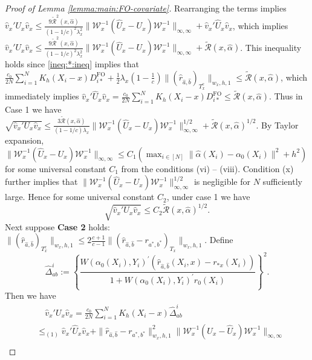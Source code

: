 \documentclass[11pt]{article}
\begin{document}
\begin{proof}[Proof of Lemma \ref{lemma:main:FO-covariate}]
Rearranging the terms implies $\hat v_x' U_x \hat v_x \leq  \frac{9\widetilde{\mathcal{R}}^2(x,\hat\alpha)}{(1-1/c)^2\lambda_x^2} \|\mathcal{W}_x^{-1}(\hat U_x - U_x)\mathcal{W}_x^{-1} \|_{\infty,\infty} + \hat v_x'\hat U_x \hat v_x$, which implies $\hat v_x' U_x \hat v_x\leq\frac{9\widetilde{\mathcal{R}}^2(x,\hat\alpha)}{(1-1/c)^2\lambda_x^2} \|\mathcal{W}_x^{-1}(\hat U_x - U_x)\mathcal{W}_x^{-1} \|_{\infty,\infty} +\widetilde{\mathcal{R}}(x,\hat\alpha)$. This inequality holds since \eqref{ineq:*:ineq} implies that $\frac{c_0}{2N}\sum_{i=1}^NK_h(X_i-x)D_{i*}^{\mathrm{FO}} + \frac{1}{2}\lambda_x\left(1-\frac{1}{c}\right)\|(\hat r_{\hat a,\hat b})_{T^c_x}\|_{w_x,h,1}\leq\widetilde{\mathcal{R}}(x,\hat\alpha)$, which immediately implies $\hat v_x'\hat U_x \hat v_x=\frac{c_0}{2N}\sum_{i=1}^NK_h(X_i-x)D_{i*}^{\mathrm{FO}}\leq\widetilde{\mathcal{R}}(x,\hat\alpha)$. Thus in Case 1 we have $\sqrt{\hat v_x' U_x \hat v_x}\leq\frac{3\widetilde{\mathcal{R}}(x,\hat\alpha)}{(1-1/c)\lambda_x} \|\mathcal{W}_x^{-1}(\hat U_x - U_x)\mathcal{W}_x^{-1} \|_{\infty,\infty}^{1/2}+\widetilde{\mathcal{R}}(x,\hat\alpha)^{1/2}$. By Taylor expansion, $\|\mathcal{W}_x^{-1}(\hat U_x - U_x)\mathcal{W}_x^{-1} \|_{\infty,\infty}\leq C_1(\max_{i\in[N]}\|\hat{\alpha}(X_i)-\alpha_0(X_i)\|^2+h^2)$ for some universal constant $C_1$ from the conditions (vi) -- (viii). 
Condition (x) further implies that $\|\mathcal{W}_x^{-1}(\hat U_x - U_x)\mathcal{W}_x^{-1} \|_{\infty,\infty}^{1/2}$ is negligible for $N$ sufficiently large. Hence for some universal constant $C_2$, under case 1 we have 
\begin{equation}\label{eq:case1:covariate}
\sqrt{\hat v_x' U_x \hat v_x}\leq C_2\widetilde{\mathcal{R}}(x,\hat\alpha)^{1/2}.
\end{equation}
Next suppose \textbf{Case 2} holds: $\displaystyle\|(\hat r_{\hat a, \hat b})_{T_x^c}\|_{w_x,h,1} \leq 2\frac{c+1}{c-1}\|(\hat r_{\hat a,\hat b} - r_{a^*,b^*})_{T_x}\|_{w_x,h,1}$. Define $$\displaystyle\hat{\Delta}_{ab}^i:=\left\{\frac{W(\alpha_0(X_i),Y_i)^\prime(\hat{r}_{\hat a,\hat b}(X_i,x)-r_{*x}(X_i))}{1+W(\alpha_0(X_i),Y_i)^\prime r_0(X_i)}\right\}^2.$$ 
Then we have
\begin{equation}\label{eq:thm1:main:main:well:covariate}
\begin{array}{rl}
&\displaystyle\quad \hat v_x' U_x \hat v_x=\frac{c_0}{2N} \sum_{i=1}^NK_h(X_i-x)\hat{\Delta}_{ab}^i\\
&\displaystyle\leq_{(1)}\hat v_x' \hat{U}_x \hat v_x+\|\hat r_{\hat a,\hat b} - r_{a^*,b^*}\|_{w_x,h,1}^2\! \|\mathcal{W}_x^{-1}(U_x-\hat U_x)\mathcal{W}_x^{-1}\|_{\infty,\infty}\\

\end{array}
\end{equation}
\end{proof}
\end{document}
